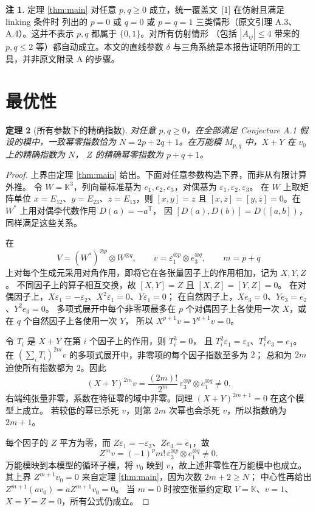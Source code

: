\documentclass[11pt,UTF8]{ctexart}
\newtheorem{theorem}{定理}[section]
\theoremstyle{definition}
\newtheorem{remark}[theorem]{注}
\newcommand{\K}{\mathbb{K}}
\begin{document}
\begin{remark}
定理 \ref{thm:main} 对任意 $p,q\ge0$ 成立，统一覆盖文~[1] 在仿射且满足 linking 条件时
列出的 $p=0$ 或 $q=0$ 或 $p=q=1$ 三类情形（原文引理 A.3、A.4）。这并不表示 $p,q$ 都属于 $\{0,1\}$。对所有仿射情形
（包括 $|A_{ij}|\le4$ 带来的 $p,q\le2$ 等）都自动成立。本文的直线参数 $\delta$
与三角系统是本报告证明所用的工具，并非原文附录 A 的步骤。
\end{remark}

\section{最优性}\label{sec:sharp}

\begin{theorem}[所有参数下的精确指数]\label{prop:sharp}
对任意 $p,q\ge0$，在全部满足 Conjecture A.1 假设的模中，一致幂零指数恰为
$N=2p+2q+1$。在万能模 $M_{p,q}$ 中，$X+Y$ 在 $v_0$ 上的精确指数为 $N$，
$Z$ 的精确幂零指数为 $p+q+1$。
\end{theorem}

\begin{proof}
上界由定理 \ref{thm:main} 给出。下面对任意参数构造下界，而非从有限计算外推。
令 $W=\K^3$，列向量标准基为 $e_1,e_2,e_3$，对偶基为 $\varepsilon_1,\varepsilon_2,\varepsilon_3$。
在 $W$ 上取矩阵单位 $x=E_{12}$、$y=E_{23}$、$z=E_{13}$，则
$[x,y]=z$ 且 $[x,z]=[y,z]=0$。在 $W^*$ 上用对偶李代数作用 $D(a)=-a^{\mathsf T}$，
因 $[D(a),D(b)]=D([a,b])$，同样满足这些关系。

在
\[
V=(W^*)^{\otimes p}\otimes W^{\otimes q},\qquad
v=\varepsilon_1^{\otimes p}\otimes e_3^{\otimes q},\qquad m=p+q
\]
上对每个生成元采用对角作用，即将它在各张量因子上的作用相加，记为 $X,Y,Z$。
不同因子上的算子相互交换，故 $[X,Y]=Z$ 且 $[X,Z]=[Y,Z]=0$。
在对偶因子上，$X\varepsilon_1=-\varepsilon_2$、$X^2\varepsilon_1=0$、$Y\varepsilon_1=0$；
在自然因子上，$Xe_3=0$、$Ye_3=e_2$、$Y^2e_3=0$。
多项式展开中每个非零项最多在 $p$ 个对偶因子上各使用一次 $X$，或在 $q$ 个自然因子上各使用一次 $Y$，
所以 $X^{p+1}v=Y^{q+1}v=0$。

令 $T_i$ 是 $X+Y$ 在第 $i$ 个因子上的作用，则 $T_i^3=0$，
且 $T_i^2\varepsilon_1=\varepsilon_3$、$T_i^2e_3=e_1$。
在 $(\sum_iT_i)^{2m}v$ 的多项式展开中，非零项的每个因子指数至多为 $2$；
总和为 $2m$ 迫使所有指数都为 $2$。因此
\[
(X+Y)^{2m}v=\frac{(2m)!}{2^m}\,
\varepsilon_3^{\otimes p}\otimes e_1^{\otimes q}\ne0.
\]
右端纯张量非零，系数在特征零的域中非零。同理 $(X+Y)^{2m+1}=0$ 在这个模型上成立。
若较低的幂已杀死 $v$，则第 $2m$ 次幂也会杀死 $v$，所以指数确为 $2m+1$。

每个因子的 $Z$ 平方为零，而 $Z\varepsilon_1=-\varepsilon_3$、$Ze_3=e_1$，故
\[
Z^m v=(-1)^p m!\,\varepsilon_3^{\otimes p}\otimes e_1^{\otimes q}\ne0.
\]
万能模映到本模型的循环子模，将 $v_0$ 映到 $v$，故上述非零性在万能模中也成立。
其上界 $Z^{m+1}v_0=0$ 来自定理 \ref{thm:main}，因为次数 $2m+2\ge N$；
中心性再给出 $Z^{m+1}(av_0)=aZ^{m+1}v_0=0$。
当 $m=0$ 时按空张量约定取 $V=\K$、$v=1$、$X=Y=Z=0$，所有公式仍成立。
\end{proof}
\end{document}
